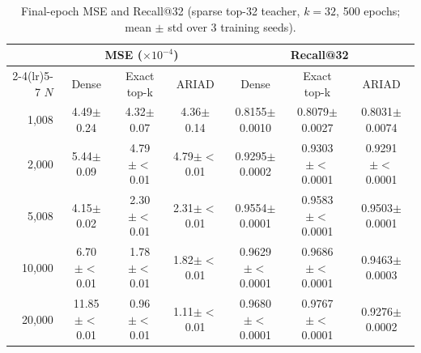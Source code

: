 \begin{table}[t]
\centering
\caption{Final-epoch MSE and Recall@32 (sparse top-32 teacher, $k=32$, 500 epochs; mean $\pm$ std over 3 training seeds).}
\small
\begin{tabular}{r ccc ccc}
\toprule
 & \multicolumn{3}{c}{MSE ($\times 10^{-4}$)} & \multicolumn{3}{c}{Recall@32} \\
\cmidrule(lr){2-4}\cmidrule(lr){5-7}
$N$ & Dense & Exact top-k & ARIAD & Dense & Exact top-k & ARIAD \\
\midrule
1,008 & 4.49$\pm$0.24 & 4.32$\pm$0.07 & 4.36$\pm$0.14 & 0.8155$\pm$0.0010 & 0.8079$\pm$0.0027 & 0.8031$\pm$0.0074 \\
2,000 & 5.44$\pm$0.09 & 4.79$\pm{<}$0.01 & 4.79$\pm{<}$0.01 & 0.9295$\pm$0.0002 & 0.9303$\pm{<}$0.0001 & 0.9291$\pm{<}$0.0001 \\
5,008 & 4.15$\pm$0.02 & 2.30$\pm{<}$0.01 & 2.31$\pm{<}$0.01 & 0.9554$\pm$0.0001 & 0.9583$\pm{<}$0.0001 & 0.9503$\pm$0.0001 \\
10,000 & 6.70$\pm{<}$0.01 & 1.78$\pm{<}$0.01 & 1.82$\pm{<}$0.01 & 0.9629$\pm{<}$0.0001 & 0.9686$\pm{<}$0.0001 & 0.9463$\pm$0.0003 \\
20,000 & 11.85$\pm{<}$0.01 & 0.96$\pm{<}$0.01 & 1.11$\pm{<}$0.01 & 0.9680$\pm{<}$0.0001 & 0.9767$\pm{<}$0.0001 & 0.9276$\pm$0.0002 \\
\bottomrule
\end{tabular}
\end{table}
